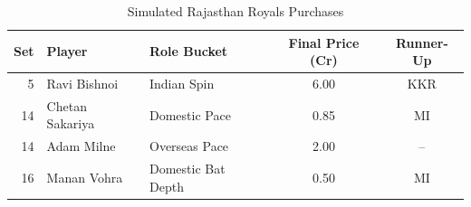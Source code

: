\begin{table}[H]
\centering
\caption{Simulated Rajasthan Royals Purchases}
\begin{tabular}{rllcc}
\toprule
Set & Player & Role Bucket & Final Price (Cr) & Runner-Up \\
\midrule
5 & Ravi Bishnoi & Indian Spin & 6.00 & KKR \\
14 & Chetan Sakariya & Domestic Pace & 0.85 & MI \\
14 & Adam Milne & Overseas Pace & 2.00 & -- \\
16 & Manan Vohra & Domestic Bat Depth & 0.50 & MI \\
\bottomrule
\end{tabular}
\end{table}
